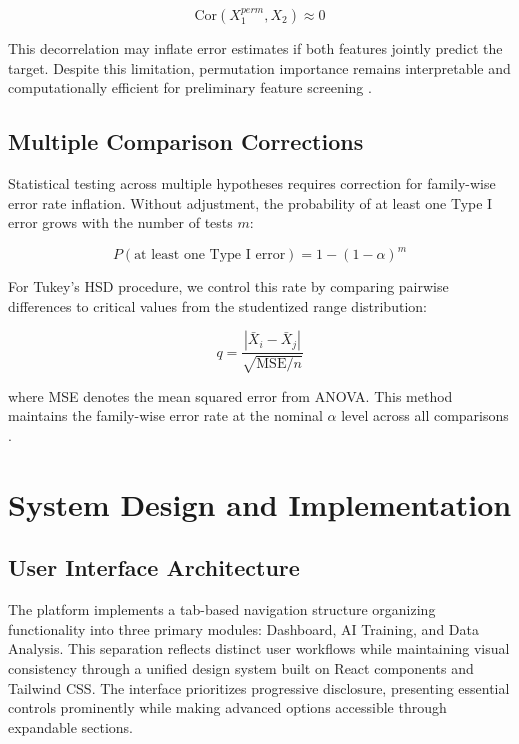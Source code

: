 \documentclass[conference]{IEEEtran}
\begin{document}
\begin{equation}
\text{Cor}(X_1^{perm}, X_2) \approx 0
\end{equation}

This decorrelation may inflate error estimates if both features jointly predict the target. Despite this limitation, permutation importance remains interpretable and computationally efficient for preliminary feature screening \cite{strobl2007bias}.

\subsection{Multiple Comparison Corrections}

Statistical testing across multiple hypotheses requires correction for family-wise error rate inflation. Without adjustment, the probability of at least one Type I error grows with the number of tests $m$:

\begin{equation}
P(\text{at least one Type I error}) = 1 - (1-\alpha)^m
\end{equation}

For Tukey's HSD procedure, we control this rate by comparing pairwise differences to critical values from the studentized range distribution:

\begin{equation}
q = \frac{|\bar{X}_i - \bar{X}_j|}{\sqrt{\text{MSE}/n}}
\end{equation}

where MSE denotes the mean squared error from ANOVA. This method maintains the family-wise error rate at the nominal $\alpha$ level across all comparisons \cite{tukey1949comparing}.

\section{System Design and Implementation}

\subsection{User Interface Architecture}

The platform implements a tab-based navigation structure organizing functionality into three primary modules: Dashboard, AI Training, and Data Analysis. This separation reflects distinct user workflows while maintaining visual consistency through a unified design system built on React components and Tailwind CSS. The interface prioritizes progressive disclosure, presenting essential controls prominently while making advanced options accessible through expandable sections.
\end{document}
